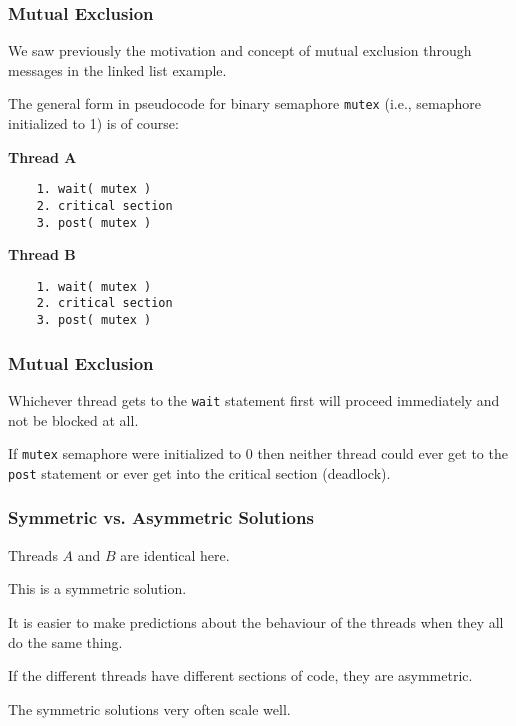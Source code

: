 \begin{frame}[fragile]
	\frametitle{Mutual Exclusion}

	We saw previously the motivation and concept of mutual exclusion through messages in the linked list example.

	The general form in pseudocode for binary semaphore \texttt{mutex} (i.e., semaphore initialized to 1) is of course:

	\begin{multicols}{2}
		\textbf{Thread A}
		\begin{verbatim}
	1. wait( mutex )
	2. critical section
	3. post( mutex )
  \end{verbatim}
		\columnbreak
		\textbf{Thread B}\vspace{-2em}
		\begin{verbatim}
	1. wait( mutex )
	2. critical section
	3. post( mutex )
  		\end{verbatim}
	\end{multicols}
	\vspace{-2em}


\end{frame}

\begin{frame}
	\frametitle{Mutual Exclusion}

	Whichever thread gets to the \texttt{wait} statement first will proceed immediately and not be blocked at all.

	If \texttt{mutex} semaphore were initialized to 0 then neither thread could ever get to the \texttt{post} statement or ever get into the critical section (deadlock).


\end{frame}

\begin{frame}
	\frametitle{Symmetric vs. Asymmetric Solutions}

	Threads $A$ and $B$ are identical here.

	This is a \alert{symmetric} solution.

	It is easier to make predictions about the behaviour of the threads when they all do the same thing.

	If the different threads have different sections of code, they are \alert{asymmetric}.

	The symmetric solutions very often scale well.


\end{frame}

